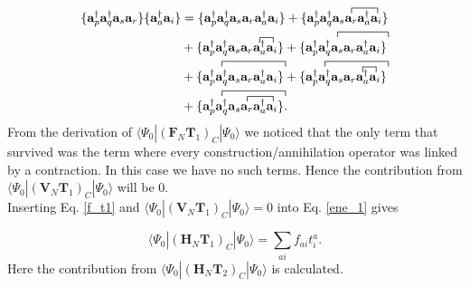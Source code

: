 \documentclass[a4paper,norsk,11pt,twoside]{report}
\begin{document}
\begin{align}
\{\textbf{a}^{\dag}_p \textbf{a}^{\dag}_q \textbf{a}_s \textbf{a}_r \} \{\textbf{a}_a^{\dag} \textbf{a}_i \} & = \{
\textbf{a}^{\dag}_p \textbf{a}^{\dag}_q \textbf{a}_s \textbf{a}_r \textbf{a}_a^{\dag} \textbf{a}_i 
\} 
+ 
\{ \textbf{a}^{\dag}_p \textbf{a}^{\dag}_q
\contraction{}{\textbf{a}_s}{\textbf{a}_r}{\textbf{a}_a^{\dag}}
 \textbf{a}_s \textbf{a}_r \textbf{a}_a^{\dag}
  \textbf{a}_i 
\}  \\ &
+ 
\{ \textbf{a}^{\dag}_p \textbf{a}^{\dag}_q \textbf{a}_s
\contraction{}{\textbf{a}_r}{}{\textbf{a}_a^{\dag}}
\textbf{a}_r \textbf{a}_a^{\dag}
\textbf{a}_i
\}
+ \{ \textbf{a}^{\dag}_p
\contraction{}{\textbf{a}^{\dag}_q}{\textbf{a}_s \textbf{a}_r \textbf{a}_a^{\dag}}{\textbf{a}_i}
\textbf{a}^{\dag}_q \textbf{a}_s \textbf{a}_r \textbf{a}_a^{\dag} \textbf{a}_i \} \nonumber \\ &
+ \{
\contraction{}{\textbf{a}^{\dag}_p}{\textbf{a}^{\dag}_q \textbf{a}_s \textbf{a}_r \textbf{a}_a^{\dag}}{\textbf{a}_i}
\textbf{a}^{\dag}_p \textbf{a}^{\dag}_q \textbf{a}_s \textbf{a}_r \textbf{a}_a^{\dag} \textbf{a}_i
\}
+ \{
\contraction{}{\textbf{a}^{\dag}_p}{\textbf{a}^{\dag}_q \textbf{a}_s \textbf{a}_r \textbf{a}_a^{\dag}}{\textbf{a}_i}
\contraction{\textbf{a}^{\dag}_p \textbf{a}^{\dag}_q \textbf{a}_s}{\textbf{a}_r}{}{\textbf{a}_a^{\dag}}
\textbf{a}^{\dag}_p \textbf{a}^{\dag}_q \textbf{a}_s \textbf{a}_r \textbf{a}_a^{\dag} \textbf{a}_i
\} \nonumber \\ &
+ \{
\contraction{}{\textbf{a}^{\dag}_p}{\textbf{a}^{\dag}_q \textbf{a}_s \textbf{a}_r \textbf{a}_a^{\dag}}{\textbf{a}_i}
\contraction{\textbf{a}^{\dag}_p \textbf{a}^{\dag}_q}{\textbf{a}_s}{\textbf{a}_r}{\textbf{a}_a^{\dag}}
\textbf{a}^{\dag}_p \textbf{a}^{\dag}_q \textbf{a}_s \textbf{a}_r \textbf{a}_a^{\dag} \textbf{a}_i
\} . \nonumber
\end{align}
From the derivation of $\langle \Psi_0 | (\textbf{F}_N \textbf{T}_1)_C | \Psi_0 \rangle$ we noticed that the only term that survived was the term where every construction/annihilation operator was linked by a contraction. In this case we have no such terms. Hence the contribution from $\langle \Psi_0 | (\textbf{V}_N \textbf{T}_1)_C | \Psi_0 \rangle$ will be 0. \\

Inserting Eq. \eqref{f_t1} and $\langle \Psi_0 | (\textbf{V}_N \textbf{T}_1)_C | \Psi_0 \rangle = 0$ into Eq. \eqref{ene_1} gives 

\begin{equation}
\langle \Psi_0 | (\textbf{H}_N \textbf{T}_1)_C | \Psi_0 \rangle = \sum_{ai} f_{ai} t_i^a . \label{Energy_Contribution_1}
\end{equation}
Here the contribution from $\langle \Psi_0 | (\textbf{H}_N \textbf{T}_2)_C | \Psi_0 \rangle$ is calculated.
\end{document}
